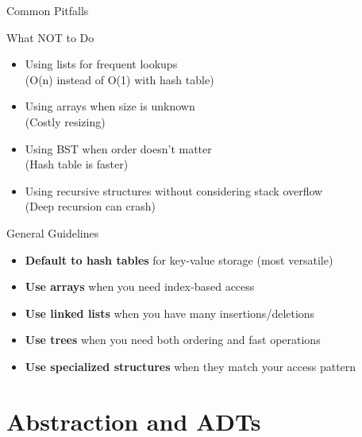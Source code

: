 \documentclass[aspectratio=169,xcolor=dvipsnames]{beamer}
\begin{document}
\begin{frame}{Common Pitfalls}
  \begin{alertblock}{What NOT to Do}
    \begin{itemize}
      \item[$\times$] Using lists for frequent lookups \\
            {\small (O(n) instead of O(1) with hash table)}
      \item[$\times$] Using arrays when size is unknown \\
            {\small (Costly resizing)}
      \item[$\times$] Using BST when order doesn't matter \\
            {\small (Hash table is faster)}
      \item[$\times$] Using recursive structures without considering stack overflow \\
            {\small (Deep recursion can crash)}
    \end{itemize}
  \end{alertblock}

  \vspace{0.5cm}

  \begin{block}{General Guidelines}
    \begin{itemize}
      \item \textbf{Default to hash tables} for key-value storage (most versatile)
      \item \textbf{Use arrays} when you need index-based access
      \item \textbf{Use linked lists} when you have many insertions/deletions
      \item \textbf{Use trees} when you need both ordering and fast operations
      \item \textbf{Use specialized structures} when they match your access pattern
    \end{itemize}
  \end{block}
\end{frame}

\section{Abstraction and ADTs}
\end{document}

